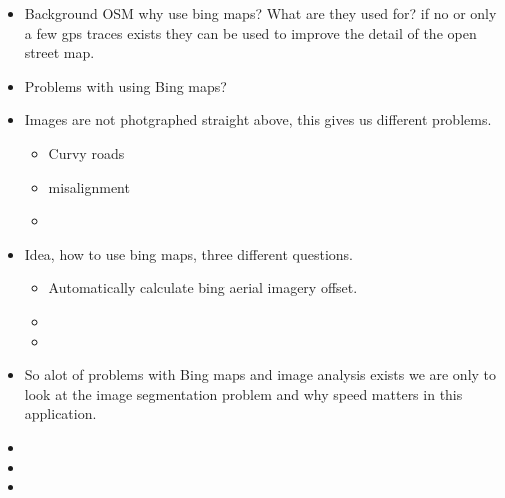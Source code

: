 
\begin{itemize}
%
%
    \item Background OSM why use bing maps? What are they used for? if no or only
        a few gps traces exists they can be used to improve the detail of the 
        open street map.
    \item Problems with using Bing maps?
    \item Images are not photgraphed straight above, this gives us different problems.
        \begin{itemize}
            \item Curvy roads
            \item misalignment
            \item
        \end{itemize}
    \item Idea, how to use bing maps, three different questions.
        \begin{itemize}
            \item Automatically calculate bing aerial imagery offset.
            \item
            \item
        \end{itemize}
    \item So alot of problems with Bing maps and image analysis exists
        we are only to look at the image segmentation problem
        and why speed matters in this application.
    \item
    \item
    \item
\end{itemize}

